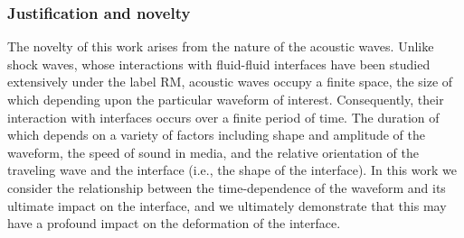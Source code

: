

\subsubsection*{Justification and novelty}
The novelty of this work arises from the nature of the acoustic
waves. Unlike shock waves, whose interactions with fluid-fluid
interfaces have been studied extensively under the label
\ac{RM}, acoustic waves occupy a finite space,
the size of which depending upon the particular waveform of
interest. Consequently, their interaction with interfaces occurs over
a finite period of time. The duration of which depends on a variety of
factors including shape and amplitude of the waveform, the speed of
sound in media, and the relative orientation of the traveling wave and
the interface (i.e., the shape of the interface). In this work we
consider the relationship between the time-dependence of the waveform
and its ultimate impact on the interface, and we ultimately
demonstrate that this may have a profound impact on the deformation
of the interface. %


